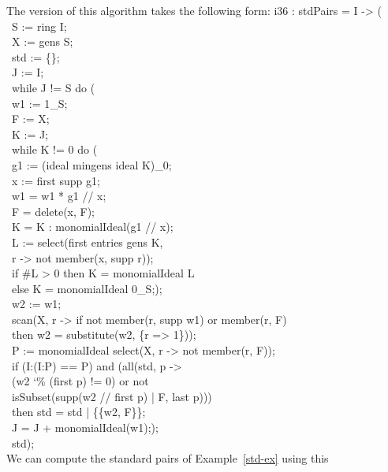 The \Mtwo version of this algorithm takes the following form:
\beginOutput
i36 : stdPairs = I -> (\\
\           S := ring I;\\
\           X := gens S;\\
\           std := \{\};\\
\           J := I;\\
\           while J != S do (\\
\                w1 := 1_S;\\
\                F := X;\\
\                K := J;\\
\                while K != 0 do (\\
\                     g1 := (ideal mingens ideal K)_0;\\
\                     x := first supp g1;\\
\                     w1 = w1 * g1 // x;\\
\                     F = delete(x, F);\\
\                     K = K : monomialIdeal(g1 // x);\\
\                     L := select(first entries gens K, \\
\                          r -> not member(x, supp r));\\
\                     if #L > 0 then K = monomialIdeal L\\
\                     else K = monomialIdeal 0_S;);\\
\                w2 := w1;\\
\                scan(X, r -> if not member(r, supp w1) or member(r, F)\\
\                     then w2 = substitute(w2, \{r => 1\}));\\
\                P := monomialIdeal select(X, r -> not member(r, F));\\
\                if (I:(I:P) == P) and (all(std, p -> \\
\                          (w2 {\char`\%} (first p) != 0) or not\\
\                          isSubset(supp(w2 // first p) | F, last p)))\\
\                then std = std | \{\{w2, F\}\};\\
\                J = J + monomialIdeal(w1););\\
\           std);\\
\endOutput
We can compute the standard pairs of Example~\ref{std-ex} using this
